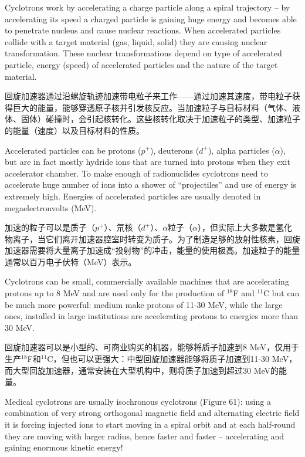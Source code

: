 \documentclass[dvipsnames, svgnames,a4paper,11pt]{article}
\begin{document}
Cyclotrons work by accelerating a charge particle along a spiral trajectory – by accelerating its speed a charged particle is gaining huge energy and becomes able to penetrate nucleus and cause nuclear reactions. When accelerated particles collide with a target material (gas, liquid, solid) they are causing nuclear transformation. These nuclear transformations depend on type of accelerated particle, energy (speed) of accelerated particles and the nature of the target material.
  
回旋加速器通过沿螺旋轨迹加速带电粒子来工作——通过加速其速度，带电粒子获得巨大的能量，能够穿透原子核并引发核反应。当加速粒子与目标材料（气体、液体、固体）碰撞时，会引起核转化。这些核转化取决于加速粒子的类型、加速粒子的能量（速度）以及目标材料的性质。
  
Accelerated particles can be protons ($p^+$), deuterons ($d^+$), alpha particles ($\alpha$), but are in fact mostly hydride ions that are turned into protons when they exit accelerator chamber. To make enough of radionuclides cyclotrons need to accelerate huge number of ions into a shower of “projectiles” and use of energy is extremely high. Energies of accelerated particles are usually denoted in megaelectronvolts (MeV).
  
加速的粒子可以是质子（$p^+$）、氘核（$d^+$）、$\alpha$粒子（$\alpha$），但实际上大多数是氢化物离子，当它们离开加速器腔室时转变为质子。为了制造足够的放射性核素，回旋加速器需要将大量离子加速成“投射物”的冲击，能量的使用极高。加速粒子的能量通常以百万电子伏特（MeV）表示。
  
Cyclotrons can be small, commercially available machines that are accelerating protons up to 8 MeV and are used only for the production of $^{18}$F and $^{11}$C but can be much more powerful: medium make protons of 11-30 MeV, while the large ones, installed in large institutions are accelerating protons to energies more than 30 MeV.
  
回旋加速器可以是小型的、可商业购买的机器，能够将质子加速到8 MeV，仅用于生产$^{18}$F和$^{11}$C，但也可以更强大：中型回旋加速器能够将质子加速到11-30 MeV，而大型回旋加速器，通常安装在大型机构中，则将质子加速到超过30 MeV的能量。


Medical cyclotrons are usually isochronous cyclotrons (Figure 61): using a combination of very strong orthogonal magnetic field and alternating electric field it is forcing injected ions to start moving in a spiral orbit and at each half-round they are moving with larger radius, hence faster and faster – accelerating and gaining enormous kinetic energy!
\end{document}
